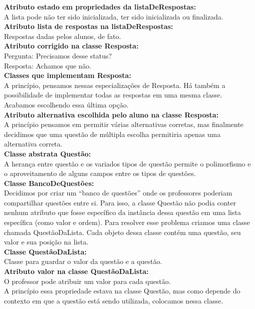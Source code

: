 \documentclass[12pt,letterpaper]{article}
\begin{document}
\textbf{Atributo estado em propriedades da listaDeRespostas:}\\
A lista pode não ter sido inicializada, ter sido inicializada ou finalizada.\\


\textbf{Atributo lista de respostas na listaDeRespostas:}\\
Respostas dadas pelos alunos, de fato.\\


\textbf{Atributo corrigido na classe Resposta: }\\
Pergunta: Precisamos desse status?\\
Resposta: Achamos que não.\\


\textbf{Classes que implementam Resposta:}\\
A princípio, pensamos nessas especializações de Resposta. Há também a possibilidade de implementar todas as respostas em uma mesma classe. Acabamos escolhendo essa última opção.\\


\textbf{Atributo alternativa escolhida pelo aluno na classe Resposta:}\\
A princípio pensamos em permitir várias alternativas corretas, mas finalmente decidimos que uma questão de múltipla escolha permitiria apenas uma alternativa correta.\\


\textbf{Classe abstrata Questão:}\\
A herança entre questão e os variados tipos de questão permite o polimorfismo e o aproveitamento de alguns campos entre os tipos de questões.\\


\textbf{Classe BancoDeQuestões:}\\
Decidimos por criar um “banco de questões” onde os professores poderiam compartilhar questões entre si. Para isso, a classe Questão não podia conter nenhum atributo que fosse específico da instância dessa questão em uma lista específica (como valor e ordem). Para resolver esse problema criamos uma classe chamada QuestãoDaLista. Cada objeto dessa classe contém uma questão, seu valor e sua posição na lista.\\


\textbf{Classe QuestãoDaLista:}\\
Classe para guardar o valor da questão e a questão.\\

\textbf{Atributo valor na classe QuestãoDaLista:}\\
O professor pode atribuir um valor para cada questão.\\
A princípio essa propriedade estava na classe Questão, mas como depende do contexto em que a questão está sendo utilizada, colocamos nessa classe.\\
\end{document}
